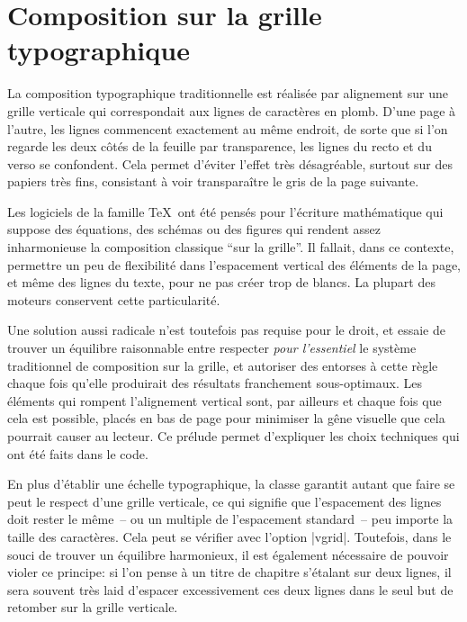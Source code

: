 \section{Composition sur la grille typographique}

\label{Composition-Grille} La composition typographique traditionnelle est réalisée par alignement sur une grille verticale qui correspondait aux lignes de caractères en plomb. D'une page à l'autre, les lignes commencent exactement au même endroit, de sorte que si l'on regarde les deux côtés de la feuille par transparence, les lignes du recto et du verso se confondent. Cela permet d'éviter l'effet très désagréable, surtout sur des papiers très fins, consistant à voir transparaître le gris de la page suivante.

Les logiciels de la famille \TeX\ ont été pensés pour l'écriture mathématique qui suppose des équations, des schémas ou des figures qui rendent assez inharmonieuse la composition classique \enquote{sur la grille}. Il fallait, dans ce contexte, permettre un peu de flexibilité dans l'espacement vertical des éléments de la page, et même des lignes du texte, pour ne pas créer trop de blancs. La plupart des moteurs conservent cette particularité.

Une solution aussi radicale n'est toutefois pas requise pour le droit, et \frenchlaw essaie de trouver un équilibre raisonnable entre respecter \emph{pour l'essentiel} le système traditionnel de composition sur la grille, et autoriser des entorses à cette règle chaque fois qu'elle produirait des résultats franchement sous-optimaux. Les éléments qui rompent l'alignement vertical sont, par ailleurs et chaque fois que cela est possible, placés en bas de page pour minimiser la gêne visuelle que cela pourrait causer au lecteur. Ce prélude permet d'expliquer les choix techniques qui ont été faits dans le code.

En plus d'établir une échelle typographique, la classe garantit autant que faire se peut le respect d'une grille verticale, ce qui signifie que l'espacement des lignes doit rester le même~-- ou un multiple de l'espacement standard~-- peu importe la taille des caractères. Cela peut se vérifier avec l'option |vgrid|. Toutefois, dans le souci de trouver un équilibre harmonieux, il est également nécessaire de pouvoir violer ce principe: si l'on pense à un titre de chapitre s'étalant sur deux lignes, il sera souvent très laid d'espacer excessivement ces deux lignes dans le seul but de retomber sur la grille verticale.

